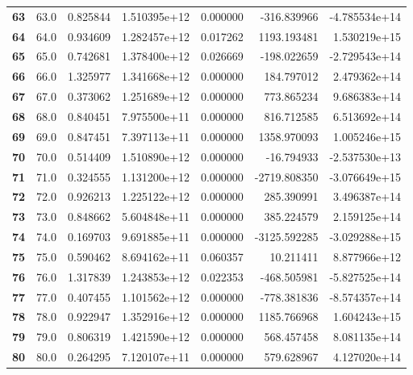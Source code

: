 \documentclass{report}[12pt]
\begin{document}
\begin{center}
\begin{tabular}{lrrrrrr}
\textbf{63  } &           63.0 &   0.825844 &  1.510395e+12 &    0.000000 &  -316.839966 & -4.785534e+14 \\
\textbf{64  } &           64.0 &   0.934609 &  1.282457e+12 &    0.017262 &  1193.193481 &  1.530219e+15 \\
\textbf{65  } &           65.0 &   0.742681 &  1.378400e+12 &    0.026669 &  -198.022659 & -2.729543e+14 \\
\textbf{66  } &           66.0 &   1.325977 &  1.341668e+12 &    0.000000 &   184.797012 &  2.479362e+14 \\
\textbf{67  } &           67.0 &   0.373062 &  1.251689e+12 &    0.000000 &   773.865234 &  9.686383e+14 \\
\textbf{68  } &           68.0 &   0.840451 &  7.975500e+11 &    0.000000 &   816.712585 &  6.513692e+14 \\
\textbf{69  } &           69.0 &   0.847451 &  7.397113e+11 &    0.000000 &  1358.970093 &  1.005246e+15 \\
\textbf{70  } &           70.0 &   0.514409 &  1.510890e+12 &    0.000000 &   -16.794933 & -2.537530e+13 \\
\textbf{71  } &           71.0 &   0.324555 &  1.131200e+12 &    0.000000 & -2719.808350 & -3.076649e+15 \\
\textbf{72  } &           72.0 &   0.926213 &  1.225122e+12 &    0.000000 &   285.390991 &  3.496387e+14 \\
\textbf{73  } &           73.0 &   0.848662 &  5.604848e+11 &    0.000000 &   385.224579 &  2.159125e+14 \\
\textbf{74  } &           74.0 &   0.169703 &  9.691885e+11 &    0.000000 & -3125.592285 & -3.029288e+15 \\
\textbf{75  } &           75.0 &   0.590462 &  8.694162e+11 &    0.060357 &    10.211411 &  8.877966e+12 \\
\textbf{76  } &           76.0 &   1.317839 &  1.243853e+12 &    0.022353 &  -468.505981 & -5.827525e+14 \\
\textbf{77  } &           77.0 &   0.407455 &  1.101562e+12 &    0.000000 &  -778.381836 & -8.574357e+14 \\
\textbf{78  } &           78.0 &   0.922947 &  1.352916e+12 &    0.000000 &  1185.766968 &  1.604243e+15 \\
\textbf{79  } &           79.0 &   0.806319 &  1.421590e+12 &    0.000000 &   568.457458 &  8.081135e+14 \\
\textbf{80  } &           80.0 &   0.264295 &  7.120107e+11 &    0.000000 &   579.628967 &  4.127020e+14 \\

\end{tabular}
\end{center}
\end{document}
